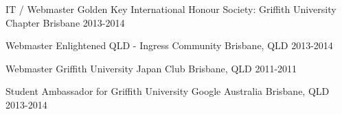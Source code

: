

\begin{cvhonors}

  \cvhonor
    {IT / Webmaster} %
    {Golden Key International Honour Society: Griffith University Chapter} %
    {Brisbane} %
    {2013-2014} %

  \cvhonor
    {Webmaster} %
    {Enlightened QLD - Ingress Community} %
    {Brisbane, QLD} %
    {2013-2014} %

  \cvhonor
    {Webmaster} %
    {Griffith University Japan Club} %
    {Brisbane, QLD} %
    {2011-2011} %

  \cvhonor
    {Student Ambassador for Griffith University} %
    {Google Australia} %
    {Brisbane, QLD} %
    {2013-2014} %

\end{cvhonors}
